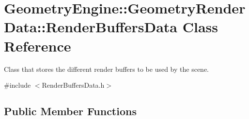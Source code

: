 \hypertarget{class_geometry_engine_1_1_geometry_render_data_1_1_render_buffers_data}{}\section{Geometry\+Engine\+::Geometry\+Render\+Data\+::Render\+Buffers\+Data Class Reference}
\label{class_geometry_engine_1_1_geometry_render_data_1_1_render_buffers_data}


Class that stores the different render buffers to be used by the scene.  




{\ttfamily \#include $<$Render\+Buffers\+Data.\+h$>$}

\subsection*{Public Member Functions}
